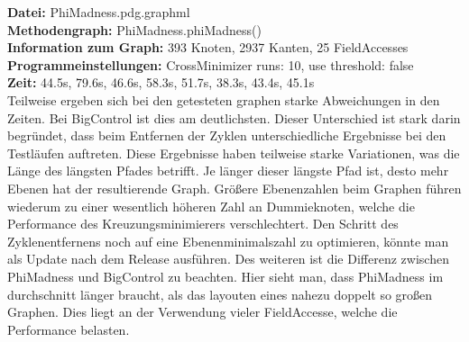 \textbf{Datei: }PhiMadness.pdg.graphml\\
\textbf{Methodengraph: }PhiMadness.phiMadness()\\
\textbf{Information zum Graph: }393 Knoten, 2937 Kanten, 25 FieldAccesses\\
\textbf{Programmeinstellungen: }CrossMinimizer runs: 10, use threshold: false\\
\textbf{Zeit: }44.5s, 79.6s, 46.6s, 58.3s, 51.7s, 38.3s, 43.4s, 45.1s\\

Teilweise ergeben sich bei den getesteten graphen starke Abweichungen in den Zeiten. Bei BigControl ist dies am deutlichsten. Dieser Unterschied ist stark darin begründet, dass beim Entfernen der Zyklen unterschiedliche Ergebnisse bei den Testläufen auftreten. Diese Ergebnisse haben teilweise starke Variationen, was die Länge des längsten Pfades betrifft. Je länger dieser längste Pfad ist, desto mehr Ebenen hat der resultierende Graph. Größere Ebenenzahlen beim Graphen führen wiederum zu einer wesentlich höheren Zahl an Dummieknoten, welche die Performance des Kreuzungsminimierers verschlechtert. Den Schritt des Zyklenentfernens noch auf eine Ebenenminimalszahl zu optimieren, könnte man als Update nach dem Release ausführen.
Des weiteren ist die Differenz zwischen PhiMadness und BigControl zu beachten. Hier sieht man, dass PhiMadness im durchschnitt länger braucht, als das layouten eines nahezu doppelt so großen Graphen. Dies liegt an der Verwendung vieler FieldAccesse, welche die Performance belasten.



